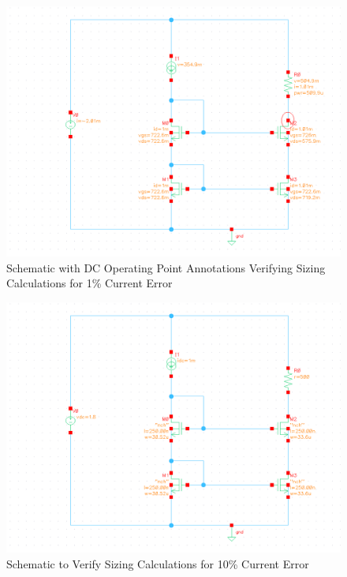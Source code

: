 \documentclass{article}
\begin{document}
\begin{figure}[H]
\centering
\includegraphics[width=6in]{p2_2_dcop_1p.png}
\caption{Schematic with DC Operating Point Annotations Verifying Sizing Calculations for 1\% Current Error}
\label{2_2_dcop}
\end{figure}

\begin{figure}[H]
\centering
\includegraphics[width=6in]{p2_2_schem.png}
\caption{Schematic to Verify Sizing Calculations for 10\% Current Error}
\label{2_2_10p_schem}
\end{figure}
\end{document}
